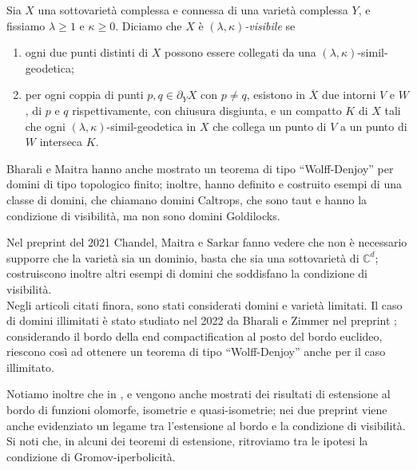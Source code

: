 \begin{defn}
    Sia $X$ una sottovarietà complessa e connessa di una varietà complessa $Y$, e fissiamo $\lambda \ge 1$ e $\kappa \ge 0$. Diciamo che $X$ è \textit{$(\lambda,\kappa)$-visibile} se
    \begin{enumerate}
        \item ogni due punti distinti di $X$ possono essere collegati da una $(\lambda,\kappa)$-simil-geodetica;
        \item per ogni coppia di punti $p,q\in\partial_YX$ con $p\not=q$, esistono in $\overline{X}$ due intorni $V$ e $W$, di $p$ e $q$ rispettivamente, con chiusura disgiunta, e un compatto $K$ di $X$ tali che  ogni $(\lambda,\kappa)$-simil-geodetica in $X$ che collega un punto di $V$ a un punto di $W$ interseca $K$.
    \end{enumerate}
\end{defn}

Bharali e Maitra hanno anche mostrato un teorema di tipo ``Wolff-Denjoy'' per domini di tipo topologico finito; inoltre, hanno definito e costruito esempi di una classe di domini, che chiamano domini Caltrops, che sono taut e hanno la condizione di visibilità, ma non sono domini Goldilocks.

Nel preprint \cite{CMS} del 2021 Chandel, Maitra e Sarkar fanno vedere che non è necessario supporre che la varietà sia un dominio, basta che sia una sottovarietà di $\mathbb{C}^d$; costruiscono inoltre altri esempi di domini che soddisfano la condizione di visibilità.\\

Negli articoli citati finora, sono stati considerati domini e varietà limitati. Il caso di domini illimitati è stato studiato nel 2022 da Bharali e Zimmer nel preprint \cite{BZ2}; considerando il bordo della end compactification al posto del bordo euclideo, riescono così ad ottenere un teorema di tipo ``Wolff-Denjoy'' anche per il caso illimitato.

Notiamo inoltre che in \cite{BZ1}, \cite{CMS} e \cite{BZ2} vengono anche mostrati dei risultati di estensione al bordo di funzioni olomorfe, isometrie e quasi-isometrie; nei due preprint viene anche evidenziato un legame tra l'estensione al bordo e la condizione di visibilità. Si noti che, in alcuni dei teoremi di estensione, ritroviamo tra le ipotesi la condizione di Gromov-iperbolicità. \\

